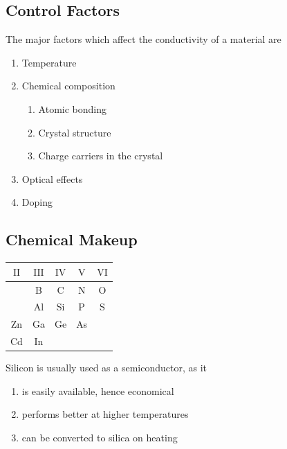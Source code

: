 \documentclass[titlepage, fleqn, a4paper, 12pt, twoside]{article}
\theoremstyle{definition}
\theoremstyle{theorem}
\begin{document}
\subsection{Control Factors}

The major factors which affect the conductivity of a material are

\begin{enumerate}
	\item Temperature
	\item Chemical composition
		\begin{enumerate}
			\item Atomic bonding
			\item Crystal structure
			\item Charge carriers in the crystal
		\end{enumerate}
	\item Optical effects
	\item Doping
\end{enumerate}

\subsection{Chemical Makeup}

\begin{table}[H]
	\begin{tabular}{c c c c c}
		\toprule
		$\mathrm{II}$ & $\mathrm{III}$ & $\mathrm{IV}$ & $\mathrm{V}$ & $\mathrm{VI}$ \\
		\midrule
                              & B              & C             & N            & O             \\
		\midrule
                              & Al             & Si            & P            & S             \\
		\midrule
		Zn            & Ga             & Ge            & As           &               \\
		\midrule
		Cd            & In             &               &              &               \\
		\bottomrule
	\end{tabular}
\end{table}

Silicon is usually used as a semiconductor, as it
\begin{enumerate}
	\item is easily available, hence economical
	\item performs better at higher temperatures
	\item can be converted to silica on heating
\end{enumerate}
\end{document}
